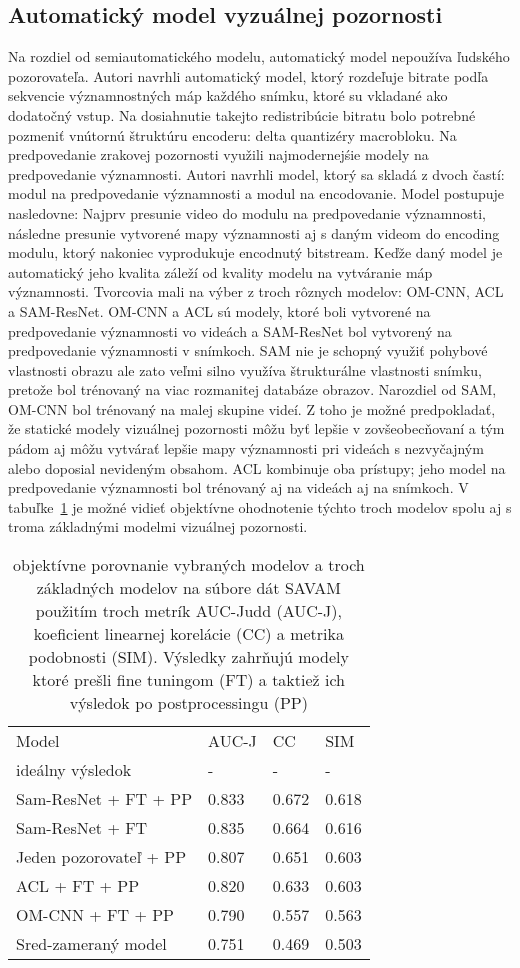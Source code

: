 \documentclass[10pt,twoside,slovak,a4paper]{article}
\begin{document}
\subsection{Automatický model vyzuálnej pozornosti} \label{auto}
Na rozdiel od semiautomatického modelu, automatický model nepoužíva ľudského pozorovateľa. Autori\cite{Czarnecki:Progress} navrhli automatický model, ktorý rozdeľuje bitrate podľa sekvencie významnostných máp každého snímku, ktoré su vkladané ako dodatočný vstup. Na dosiahnutie takejto redistribúcie bitratu bolo potrebné pozmeniť vnútornú štruktúru encoderu: delta quantizéry macrobloku. Na predpovedanie zrakovej pozornosti využili najmodernejśie modely na predpovedanie významnosti. Autori\cite{Czarnecki:Progress} navrhli model, ktorý sa skladá z dvoch častí: modul na predpovedanie významnosti a modul na encodovanie. Model postupuje nasledovne: Najprv presunie video do modulu na predpovedanie významnosti, následne presunie vytvorené mapy významnosti aj s daným videom do encoding modulu, ktorý nakoniec vyprodukuje encodnutý bitstream. Keďže daný model je automatický jeho kvalita záleží od kvality modelu na vytváranie máp významnosti. Tvorcovia mali na výber z troch rôznych modelov: OM-CNN, ACL a SAM-ResNet. OM-CNN a ACL sú modely, ktoré boli vytvorené na predpovedanie významnosti vo videách a SAM-ResNet bol vytvorený na predpovedanie významnosti v snímkoch. SAM nie je schopný využiť pohybové vlastnosti obrazu ale zato veľmi silno využíva štrukturálne vlastnosti snímku, pretože bol trénovaný na viac rozmanitej databáze obrazov. Narozdiel od SAM, OM-CNN bol trénovaný na malej skupine videí. Z toho je možné predpokladať, že statické modely vizuálnej pozornosti môžu byť lepšie v zovšeobecňovaní a tým pádom aj môžu vytvárať lepšie mapy významnosti pri videách s nezvyčajným alebo doposial nevideným obsahom. ACL kombinuje oba prístupy; jeho model na predpovedanie významnosti bol trénovaný aj na videách aj na snímkoch. V tabuľke~\ref{tab:mapy} je možné vidieť objektívne ohodnotenie týchto troch modelov spolu aj s troma základnými modelmi vizuálnej pozornosti.
\begin{table}[h]
\caption{objektívne porovnanie vybraných modelov a troch základných modelov na súbore dát SAVAM použitím troch metrík AUC-Judd (AUC-J), koeficient linearnej korelácie (CC) a metrika podobnosti (SIM). Výsledky zahrňujú modely ktoré prešli fine tuningom (FT) a taktiež ich výsledok po postprocessingu (PP)\\}
\label{tab:mapy}
\begin{tabular}{llll}
Model                  & AUC-J & CC    & SIM   \\
ideálny výsledok       & -     & -     & -     \\
Sam-ResNet + FT + PP   & 0.833 & 0.672 & 0.618 \\
Sam-ResNet + FT        & 0.835 & 0.664 & 0.616 \\
Jeden pozorovateľ + PP & 0.807 & 0.651 & 0.603 \\
ACL + FT + PP          & 0.820 & 0.633 & 0.603 \\
OM-CNN + FT + PP       & 0.790 & 0.557 & 0.563 \\
Sred-zameraný model    & 0.751 & 0.469 & 0.503
\end{tabular}
\end{table}
\end{document}
